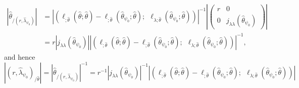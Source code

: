 \begin{align*}
    \left| \hat\theta_{/(r, \hat\lambda_{\psi_0})} \right|
    &= \left| \left(\ell_{;\hat\theta}(\hat\theta; \hat\theta) - \ell_{;\hat\theta}(\hat\theta_{\psi_0}; \hat\theta); \ \ \ell_{\lambda; \hat\theta}(\hat\theta_{\psi_0}; \hat\theta) \right) \right|^{-1} \left| \left(\begin{matrix}
        r & 0\\
        0 & j_{\lambda\lambda}(\hat\theta_{\psi_0})
    \end{matrix}\right) \right|\\
    &= r \left| j_{\lambda\lambda}(\hat\theta_{\psi_0}) \right| \left| \left(\ell_{;\hat\theta}(\hat\theta; \hat\theta) - \ell_{;\hat\theta}(\hat\theta_{\psi_0}; \hat\theta); \ \ \ell_{\lambda; \hat\theta}(\hat\theta_{\psi_0}; \hat\theta) \right) \right|^{-1},
\end{align*}
and hence
\begin{equation*}
    \left| (r, \hat\lambda_{\psi_0})_{/\hat\theta}\right| = \left| \hat\theta_{/(r, \hat\lambda_{\psi_0})} \right|^{-1} = r^{-1} \left| j_{\lambda\lambda}(\hat\theta_{\psi_0}) \right|^{-1} \left| \left(\ell_{;\hat\theta}(\hat\theta; \hat\theta) - \ell_{;\hat\theta}(\hat\theta_{\psi_0}; \hat\theta); \ \ \ell_{\lambda; \hat\theta}(\hat\theta_{\psi_0}; \hat\theta) \right) \right|
\end{equation*}
